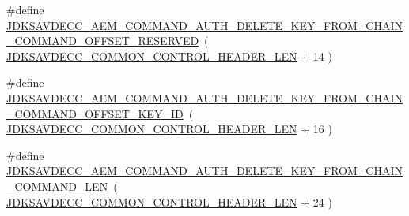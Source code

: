 \begin{DoxyCompactItemize}
\item 
\#define \hyperlink{group__command__auth__delete__key__from__chain_gae120f647e50562b71be441e6d7784f26}{J\+D\+K\+S\+A\+V\+D\+E\+C\+C\+\_\+\+A\+E\+M\+\_\+\+C\+O\+M\+M\+A\+N\+D\+\_\+\+A\+U\+T\+H\+\_\+\+D\+E\+L\+E\+T\+E\+\_\+\+K\+E\+Y\+\_\+\+F\+R\+O\+M\+\_\+\+C\+H\+A\+I\+N\+\_\+\+C\+O\+M\+M\+A\+N\+D\+\_\+\+O\+F\+F\+S\+E\+T\+\_\+\+R\+E\+S\+E\+R\+V\+ED}~( \hyperlink{group__jdksavdecc__avtp__common__control__header_gaae84052886fb1bb42f3bc5f85b741dff}{J\+D\+K\+S\+A\+V\+D\+E\+C\+C\+\_\+\+C\+O\+M\+M\+O\+N\+\_\+\+C\+O\+N\+T\+R\+O\+L\+\_\+\+H\+E\+A\+D\+E\+R\+\_\+\+L\+EN} + 14 )
\item 
\#define \hyperlink{group__command__auth__delete__key__from__chain_ga1221dc70bf6f5622aaa7fb2bf110c65e}{J\+D\+K\+S\+A\+V\+D\+E\+C\+C\+\_\+\+A\+E\+M\+\_\+\+C\+O\+M\+M\+A\+N\+D\+\_\+\+A\+U\+T\+H\+\_\+\+D\+E\+L\+E\+T\+E\+\_\+\+K\+E\+Y\+\_\+\+F\+R\+O\+M\+\_\+\+C\+H\+A\+I\+N\+\_\+\+C\+O\+M\+M\+A\+N\+D\+\_\+\+O\+F\+F\+S\+E\+T\+\_\+\+K\+E\+Y\+\_\+\+ID}~( \hyperlink{group__jdksavdecc__avtp__common__control__header_gaae84052886fb1bb42f3bc5f85b741dff}{J\+D\+K\+S\+A\+V\+D\+E\+C\+C\+\_\+\+C\+O\+M\+M\+O\+N\+\_\+\+C\+O\+N\+T\+R\+O\+L\+\_\+\+H\+E\+A\+D\+E\+R\+\_\+\+L\+EN} + 16 )
\item 
\#define \hyperlink{group__command__auth__delete__key__from__chain_ga701f74f6c66335250d7cb6bf5b6ea0fa}{J\+D\+K\+S\+A\+V\+D\+E\+C\+C\+\_\+\+A\+E\+M\+\_\+\+C\+O\+M\+M\+A\+N\+D\+\_\+\+A\+U\+T\+H\+\_\+\+D\+E\+L\+E\+T\+E\+\_\+\+K\+E\+Y\+\_\+\+F\+R\+O\+M\+\_\+\+C\+H\+A\+I\+N\+\_\+\+C\+O\+M\+M\+A\+N\+D\+\_\+\+L\+EN}~( \hyperlink{group__jdksavdecc__avtp__common__control__header_gaae84052886fb1bb42f3bc5f85b741dff}{J\+D\+K\+S\+A\+V\+D\+E\+C\+C\+\_\+\+C\+O\+M\+M\+O\+N\+\_\+\+C\+O\+N\+T\+R\+O\+L\+\_\+\+H\+E\+A\+D\+E\+R\+\_\+\+L\+EN} + 24 )
\end{DoxyCompactItemize}
